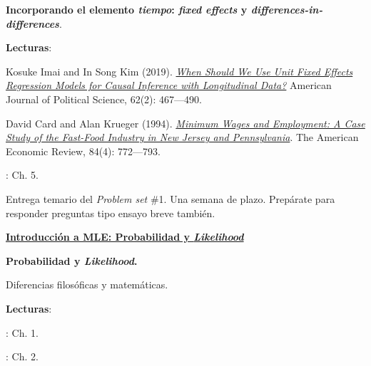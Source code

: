 \documentclass[letterpaper]{article}
\renewenvironment{itemize}{
  \begin{list}{}{
    \setlength{\leftmargin}{1.5em}
  }
}{
  \end{list}
}
\begin{document}
\begin{enumerate}[label=\roman*.]
            \begin{itemize} 
            \item[6.] {\bf Incorporando el elemento \emph{tiempo}: \emph{fixed effects} y \emph{differences-in-differences}}.
                \begin{itemize} 
                \item[$\circ$] {\bf Lecturas}: 
                  \begin{itemize} 
                    \item[$\diamond$] Kosuke Imai and In Song Kim (2019). \href{https://github.com/hbahamonde/MLE/raw/master/Readings/Imai_FE.pdf}{\emph{When Should We Use Unit Fixed Effects Regression Models for Causal Inference with Longitudinal Data?}} American Journal of Political Science, 62(2): 467---490.
                    \item[$\diamond$] David Card and Alan Krueger (1994). \href{https://github.com/hbahamonde/MLE/raw/master/Readings/King.pdf}{\emph{Minimum Wages and Employment: A Case Study of the Fast-Food Industry in New Jersey and Pennsylvania}}. The American Economic Review, 84(4): 772---793.
                    \item[$\diamond$] \textcite{Angrist2009}: Ch. 5.
                  \end{itemize}
                \end{itemize}
            \end{itemize}

\item[{\color{red}\Pointinghand}] Entrega temario del \emph{Problem set} \#1. Una semana de plazo. Prep\'arate para responder preguntas tipo ensayo breve tambi\'en.

	\item {\bf {\color{ForestGreen}\underline{Introducci\'on a MLE: Probabilidad y \emph{Likelihood}}}}


      \begin{itemize} 
        \item[7.] {\bf Probabilidad y \emph{Likelihood}.}
        \begin{itemize} 
          \item[$\circ$] Diferencias filos\'oficas y matem\'aticas.
          \item[$\circ$] {\bf Lecturas}: 
            \begin{itemize} 
              \item[$\diamond$] \textcite{Ward2018}: Ch. 1.
              \item[$\diamond$] \textcite{King1998}: Ch. 2.
            \end{itemize}
        \end{itemize}
      \end{itemize}



\end{enumerate}
\end{document}
